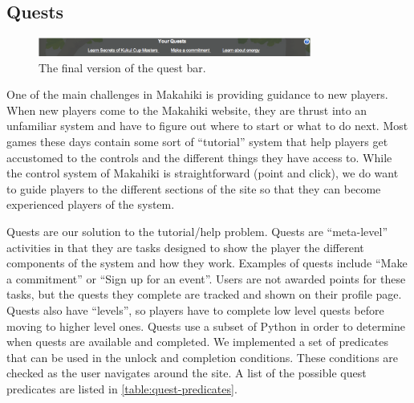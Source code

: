 \subsection{Quests}
\label{makahiki:components-quests}

\begin{figure}[h]
  \center
  \includegraphics[width=0.8\textwidth]{images/quest-bar-final.eps}
  \caption{The final version of the quest bar.}
  \label{fig:quest-bar-final}
\end{figure}

One of the main challenges in Makahiki is providing guidance to new players.  When new players come to the Makahiki website, they are thrust into an unfamiliar system and have to figure out where to start or what to do next.  Most games these days contain some sort of ``tutorial'' system that help players get accustomed to the controls and the different things they have access to.  While the control system of Makahiki is straightforward (point and click), we do want to guide players to the different sections of the site so that they can become experienced players of the system.

Quests are our solution to the tutorial/help problem.  Quests are ``meta-level'' activities in that they are tasks designed to show the player the different components of the system and how they work.  Examples of quests include ``Make a commitment'' or ``Sign up for an event''.  Users are not awarded points for these tasks, but the quests they complete are tracked and shown on their profile page.  Quests also have ``levels'', so players have to complete low level quests before moving to higher level ones.  Quests use a subset of Python in order to determine when quests are available and completed.  We implemented a set of predicates that can be used in the unlock and completion conditions.  These conditions are checked as the user navigates around the site. A list of the possible quest predicates are listed in \autoref{table:quest-predicates}.

